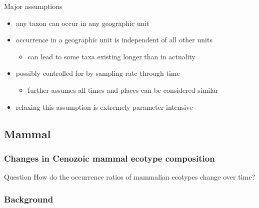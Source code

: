 \documentclass{beamer}
\begin{document}
\begin{frame}
  \begin{block}{Major assumptions}
    \begin{itemize}
      \item any taxon can occur in any geographic unit 
      \item occurrence in a geographic unit is independent of all other units
        \begin{itemize}
          \item can lead to some taxa existing longer than in actuality
        \end{itemize}
      \item possibly controlled for by sampling rate through time
        \begin{itemize}
          \item further assumes all times and places can be considered similar
        \end{itemize}
      \item relaxing this assumption is extremely parameter intensive
    \end{itemize}
  \end{block}
\end{frame}

\subsection{Mammal}
\begin{frame}
  \frametitle{Changes in Cenozoic mammal ecotype composition}

  \begin{alertblock}{Question}
    How do the occurrence ratios of mammalian ecotypes change over time?
  \end{alertblock}
\end{frame}

\begin{frame}
  \frametitle{Background}
\end{frame}
\end{document}
